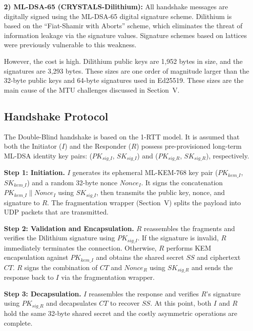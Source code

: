 \documentclass[10pt, conference, letterpaper]{IEEEtran}
\begin{document}
\textbf{2) ML-DSA-65 (CRYSTALS-Dilithium):} All handshake messages are digitally signed using the ML-DSA-65 digital signature scheme. Dilithium is based on the ``Fiat-Shamir with Aborts'' scheme, which eliminates the threat of information leakage via the signature values. Signature schemes based on lattices were previously vulnerable to this weakness.

However, the cost is high. Dilithium public keys are 1,952 bytes in size, and the signatures are 3,293 bytes. These sizes are one order of magnitude larger than the 32-byte public keys and 64-byte signatures used in Ed25519. These sizes are the main cause of the MTU challenges discussed in Section~V.

\subsection{Handshake Protocol}

The Double-Blind handshake is based on the 1-RTT model. It is assumed that both the Initiator ($I$) and the Responder ($R$) possess pre-provisioned long-term ML-DSA identity key pairs: ($PK_{sig\_I}$, $SK_{sig\_I}$) and ($PK_{sig\_R}$, $SK_{sig\_R}$), respectively.



\textbf{Step 1: Initiation.} $I$ generates its ephemeral ML-KEM-768 key pair ($PK_{kem\_I}$, $SK_{kem\_I}$) and a random 32-byte nonce $Nonce_I$. It signs the concatenation $PK_{kem\_I} \| Nonce_I$ using $SK_{sig\_I}$, then transmits the public key, nonce, and signature to $R$. The fragmentation wrapper (Section~V) splits the payload into UDP packets that are transmitted.

\textbf{Step 2: Validation and Encapsulation.} $R$ reassembles the fragments and verifies the Dilithium signature using $PK_{sig\_I}$. If the signature is invalid, $R$ immediately terminates the connection. Otherwise, $R$ performs KEM encapsulation against $PK_{kem\_I}$ and obtains the shared secret $SS$ and ciphertext $CT$. $R$ signs the combination of $CT$ and $Nonce_R$ using $SK_{sig\_R}$ and sends the response back to $I$ via the fragmentation wrapper.

\textbf{Step 3: Decapsulation.} $I$ reassembles the response and verifies $R$'s signature using $PK_{sig\_R}$ and decapsulates $CT$ to recover $SS$. At this point, both $I$ and $R$ hold the same 32-byte shared secret and the costly asymmetric operations are complete.
\end{document}
